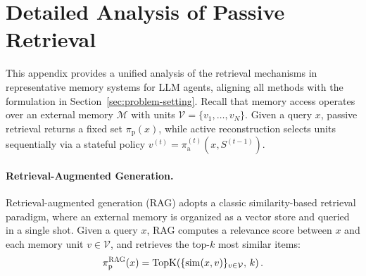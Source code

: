 \newpage
\appendix
\onecolumn


\section{Detailed Analysis of Passive Retrieval}
\label{app:retrieval-analysis}

This appendix provides a unified analysis of the retrieval mechanisms in representative memory systems for LLM agents, aligning all methods with the formulation in Section~\ref{sec:problem-setting}. Recall that memory access operates over an external memory $\mathcal{M}$ with units $\mathcal{V}=\{v_1,\ldots,v_N\}$. Given a query $x$, passive retrieval returns a fixed set $\pi_{\mathrm p}(x)$, while active reconstruction selects units sequentially via a stateful policy $v^{(t)}=\pi_{\mathrm a}^{(t)}(x,S^{(t-1)})$.

\label{app:analysis-existing}


\paragraph{Retrieval-Augmented Generation.}
Retrieval-augmented generation (RAG) adopts a classic similarity-based retrieval paradigm, where an external memory is organized as a vector store and queried in a single shot. Given a query $x$, RAG computes a relevance score between $x$ and each memory unit $v\in\mathcal{V}$, and retrieves the top-$k$ most similar items:
\begin{equation}
\pi_{\mathrm p}^{\textsc{RAG}}(x)
=
\mathrm{TopK}\!\left(\{\mathrm{sim}(x,v)\}_{v\in\mathcal{V}},\,k\right).
\end{equation}


